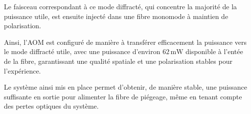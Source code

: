 Le faisceau correspondant à ce mode diffracté, qui concentre la majorité de la puissance utile, est ensuite injecté dans une fibre monomode à maintien de polarisation. 

Ainsi, l’AOM est configuré de manière à transférer efficacement la puissance vers le mode diffracté utile, avec une puissance d’environ $62\,\text{mW}$ disponible à l'entée de la fibre, garantissant une qualité spatiale et une polarisation stables pour l’expérience.


Le système ainsi mis en place permet d’obtenir, de manière stable, une puissance suffisante en sortie pour alimenter la fibre de piégeage, même en tenant compte des pertes optiques du système.



%
%
%
